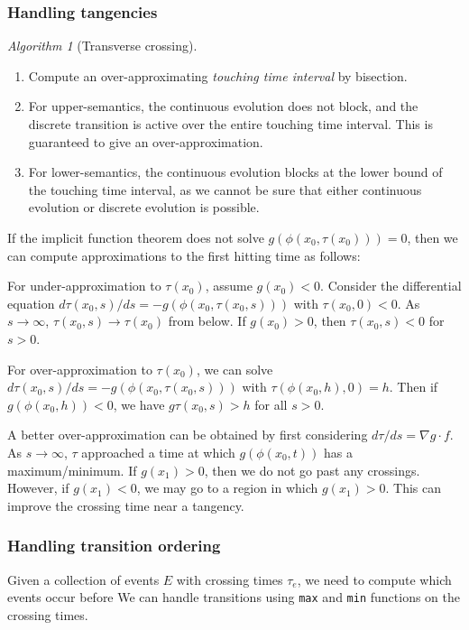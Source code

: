 \documentclass[english,a4paper]{article}
\theoremstyle{theorem}
\theoremstyle{definition}
\theoremstyle{remark}
\newtheorem*{algorithm*}{Algorithm}
\begin{document}
\subsubsection*{Handling tangencies}

\begin{algorithm*}[Transverse crossing]\mbox{}
\begin{enumerate}
\item Compute an over-approximating \emph{touching time interval} by bisection.
\item For upper-semantics, the continuous evolution does not block, and the discrete transition is active over the entire touching time interval. This is guaranteed to give an over-approximation.
\item For lower-semantics, the continuous evolution blocks at the lower bound of the touching time interval, as we cannot be sure that either continuous evolution or discrete evolution is possible.
\end{enumerate}
\end{algorithm*}

If the implicit function theorem does not solve $g(\phi(x_0,\tau(x_0)))=0$, then we can compute approximations to the first hitting time as follows:

For under-approximation to $\tau(x_0)$, assume $g(x_0)<0$. Consider the differential equation $d\tau(x_0,s)/ds = -g(\phi(x_0,\tau(x_0,s)))$ with $\tau(x_0,0)<0$. As $s\to\infty$, $\tau(x_0,s)\to \tau(x_0)$ from below.
If $g(x_0)>0$, then $\tau(x_0,s)<0$ for $s>0$.

For over-approximation to $\tau(x_0)$, we can solve $d\tau(x_0,s)/ds=-g(\phi(x_0,\tau(x_0,s)))$ with $\tau(\phi(x_0,h),0)=h$.
Then if $g(\phi(x_0,h))<0$, we have $g\tau(x_0,s)>h$ for all $s>0$.

A better over-approximation can be obtained by first considering $d\tau/ds=\nabla g\cdot f$. As $s\to\infty$, $\tau$ approached a time at which $g(\phi(x_0,t))$ has a maximum/minimum. If $g(x_1)>0$, then we do not go past any crossings. However, if $g(x_1)<0$, we may go to a region in which $g(x_1)>0$. This can improve the crossing time near a tangency.





\subsubsection*{Handling transition ordering}

Given a collection of events $E$ with crossing times $\tau_e$, we need to compute which events occur before We can handle transitions using \texttt{max} and \texttt{min} functions on the crossing times.
\end{document}
